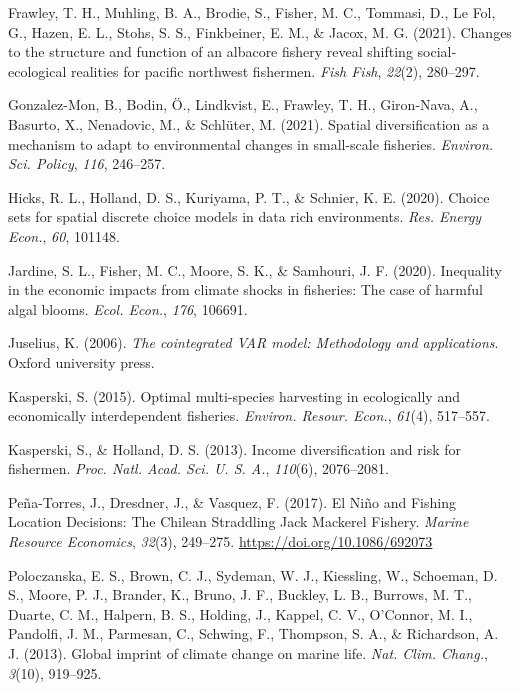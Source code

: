 \documentclass[
  11pt,
]{article}
\newlength{\cslhangindent}
\newenvironment{CSLReferences}[2] %
 {\begin{list}{}{%
  \setlength{\itemindent}{0pt}
  \setlength{\leftmargin}{0pt}
  \setlength{\parsep}{0pt}
  \ifodd #1
   \setlength{\leftmargin}{\cslhangindent}
   \setlength{\itemindent}{-1\cslhangindent}
  \fi
  \setlength{\itemsep}{#2\baselineskip}}}
 {\end{list}}
\begin{document}
\begin{CSLReferences}{1}{0}
Frawley, T. H., Muhling, B. A., Brodie, S., Fisher, M. C., Tommasi, D.,
Le Fol, G., Hazen, E. L., Stohs, S. S., Finkbeiner, E. M., \& Jacox, M.
G. (2021). Changes to the structure and function of an albacore fishery
reveal shifting social‐ecological realities for pacific northwest
fishermen. \emph{Fish Fish}, \emph{22}(2), 280--297.

Gonzalez-Mon, B., Bodin, Ö., Lindkvist, E., Frawley, T. H., Giron-Nava,
A., Basurto, X., Nenadovic, M., \& Schlüter, M. (2021). Spatial
diversification as a mechanism to adapt to environmental changes in
small-scale fisheries. \emph{Environ. Sci. Policy}, \emph{116},
246--257.

Hicks, R. L., Holland, D. S., Kuriyama, P. T., \& Schnier, K. E. (2020).
Choice sets for spatial discrete choice models in data rich
environments. \emph{Res. Energy Econ.}, \emph{60}, 101148.

Jardine, S. L., Fisher, M. C., Moore, S. K., \& Samhouri, J. F. (2020).
Inequality in the economic impacts from climate shocks in fisheries: The
case of harmful algal blooms. \emph{Ecol. Econ.}, \emph{176}, 106691.

Juselius, K. (2006). \emph{The cointegrated VAR model: Methodology and
applications}. Oxford university press.

Kasperski, S. (2015). Optimal multi-species harvesting in ecologically
and economically interdependent fisheries. \emph{Environ. Resour.
Econ.}, \emph{61}(4), 517--557.

Kasperski, S., \& Holland, D. S. (2013). Income diversification and risk
for fishermen. \emph{Proc. Natl. Acad. Sci. U. S. A.}, \emph{110}(6),
2076--2081.

Peña-Torres, J., Dresdner, J., \& Vasquez, F. (2017). {El Niño and
Fishing Location Decisions: The Chilean Straddling Jack Mackerel
Fishery}. \emph{Marine Resource Economics}, \emph{32}(3), 249--275.
\url{https://doi.org/10.1086/692073}

Poloczanska, E. S., Brown, C. J., Sydeman, W. J., Kiessling, W.,
Schoeman, D. S., Moore, P. J., Brander, K., Bruno, J. F., Buckley, L.
B., Burrows, M. T., Duarte, C. M., Halpern, B. S., Holding, J., Kappel,
C. V., O'Connor, M. I., Pandolfi, J. M., Parmesan, C., Schwing, F.,
Thompson, S. A., \& Richardson, A. J. (2013). Global imprint of climate
change on marine life. \emph{Nat. Clim. Chang.}, \emph{3}(10), 919--925.


\end{CSLReferences}
\end{document}
